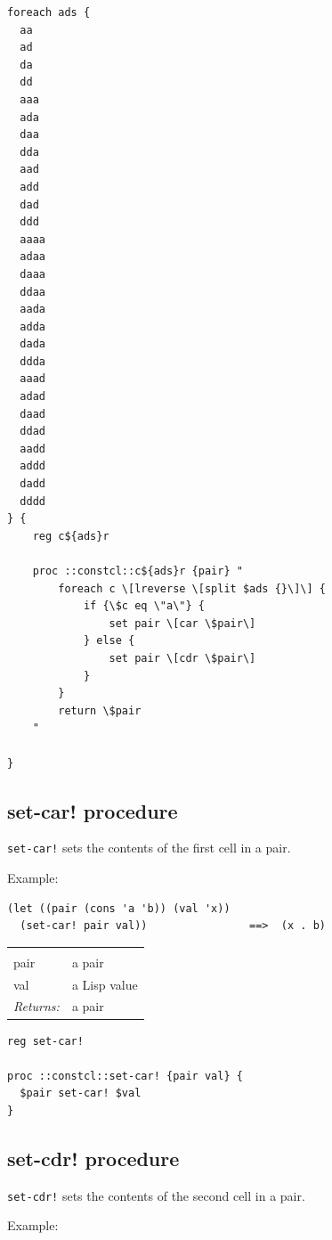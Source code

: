 \documentclass[twoside,9pt]{report}
\begin{document}
\begin{lstlisting}
foreach ads {
  aa
  ad
  da
  dd
  aaa
  ada
  daa
  dda
  aad
  add
  dad
  ddd
  aaaa
  adaa
  daaa
  ddaa
  aada
  adda
  dada
  ddda
  aaad
  adad
  daad
  ddad
  aadd
  addd
  dadd
  dddd
} {
    reg c${ads}r

    proc ::constcl::c${ads}r {pair} "
        foreach c \[lreverse \[split $ads {}\]\] {
            if {\$c eq \"a\"} {
                set pair \[car \$pair\]
            } else {
                set pair \[cdr \$pair\]
            }
        }
        return \$pair
    "

}
\end{lstlisting}
\subsection{set-car! procedure}
\label{set-car"!-procedure}


\texttt{set-car!} sets the contents of the first cell in a pair.



Example:

\begin{verbatim}
(let ((pair (cons 'a 'b)) (val 'x))
  (set-car! pair val))                ==>  (x . b)
\end{verbatim}
\noindent\begin{tabular}{ |p{1.9cm} p{8cm}| }
\hline
\rowcolor[HTML]{CCCCCC} \multicolumn{2}{|l|}{\bf set-car! (public)} \\
pair & a pair \\
val & a Lisp value \\
\textit{Returns:} & a pair \\
\hline
\end{tabular}
\begin{lstlisting}
reg set-car!

proc ::constcl::set-car! {pair val} {
  $pair set-car! $val
}
\end{lstlisting}
\subsection{set-cdr! procedure}
\label{set-cdr"!-procedure}


\texttt{set-cdr!} sets the contents of the second cell in a pair.



Example:
\end{document}
